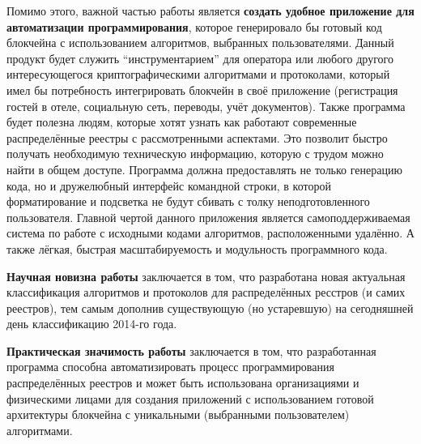 Помимо этого, важной частью работы является \textbf{создать удобное приложение для
автоматизации программирования}, которое генерировало бы готовый код блокчейна с
использованием алгоритмов, выбранных пользователями. Данный продукт будет
служить ``инструментарием'' для оператора или любого другого интересующегося
криптографическими алгоритмами и протоколами, который имел бы потребность
интегрировать блокчейн в своё приложение (регистрация гостей в отеле,
социальную сеть, переводы, учёт документов). Также программа будет полезна
людям, которые хотят узнать как работают современные распределённые реестры с
рассмотренными аспектами. Это позволит быстро получать необходимую техническую
информацию, которую с трудом можно найти в общем доступе. Программа должна
предоставлять не только генерацию кода, но и дружелюбный интерфейс командной
строки, в которой форматирование и подсветка не будут сбивать с толку
неподготовленного пользователя.
Главной чертой данного приложения является самоподдерживаемая система по работе
с исходными кодами алгоритмов, расположенными удалённо. А также лёгкая,
быстрая масштабируемость и модульность программного кода.

\textbf{Научная новизна работы} заключается в том, что разработана новая
актуальная классификация алгоритмов и протоколов для распределённых ресстров (и
самих реестров), тем самым дополнив существующую (но устаревшую) на сегодняшней
день классификацию 2014-го года.

\textbf{Практическая значимость работы} заключается в том, что разработанная
программа способна автоматизировать процесс программирования распределённых
реестров и может быть использована организациями и физическими лицами для
создания приложений с использованием готовой архитектуры блокчейна с
уникальными (выбранными пользователем) алгоритмами.
